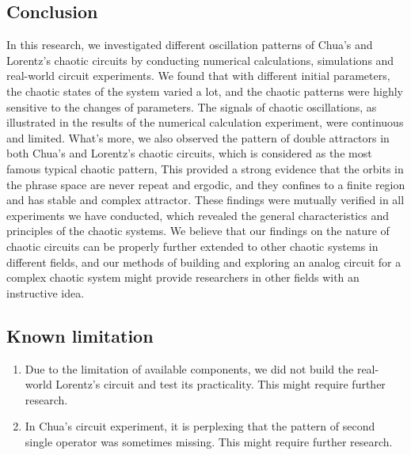 \documentclass[10pt,a4paper,twocolumn,twoside,UTF8]{article}
\begin{document}
	\subsection{Conclusion}
		In this research, we investigated different oscillation patterns of Chua's and Lorentz's chaotic circuits by conducting numerical calculations, simulations and real-world circuit experiments.
		We found that with different initial parameters, the chaotic states of the system varied a lot, and the chaotic patterns were highly sensitive to the changes of parameters.
		The signals of chaotic oscillations, as illustrated in the results of the numerical calculation experiment, were continuous and limited.
		What's more, we also observed the pattern of double attractors in both Chua's and Lorentz's chaotic circuits, which is considered as the most famous typical chaotic pattern,
		This provided a strong evidence that the orbits in the phrase space are never repeat and ergodic, and they confines to a finite region and has stable and complex attractor.
		These findings were mutually verified in all experiments we have conducted, which revealed the general characteristics and principles of the chaotic systems.
		We believe that our findings on the nature of chaotic circuits can be properly further extended to other chaotic systems in different fields, 
		and our methods of building and exploring an analog circuit for a complex chaotic system might provide researchers in other fields with an instructive idea.
	\subsection{Known limitation}
		\begin{enumerate}[label=\arabic*.]
			\item Due to the limitation of available components, we did not build the real-world Lorentz's circuit and test its practicality. This might require further research.
			\item In Chua's circuit experiment, it is perplexing that the pattern of second single operator was sometimes missing. This might require further research.
		\end{enumerate}


\printbibliography[title=Reference] 
\end{document}
